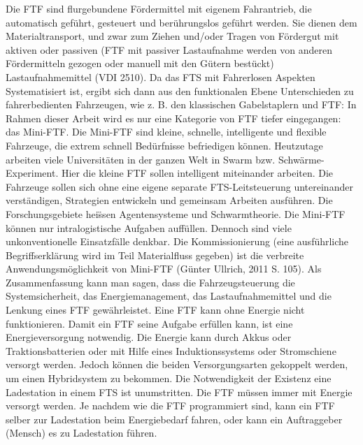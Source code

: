 Die FTF sind flurgebundene F\"ordermittel mit eigenem Fahrantrieb, die automatisch gef\"uhrt, gesteuert und ber\"uhrungslos gef\"uhrt werden. Sie dienen dem Materialtransport, und zwar zum Ziehen und/oder Tragen von F\"ordergut mit aktiven oder passiven (FTF mit passiver Lastaufnahme werden von anderen F\"ordermitteln gezogen oder manuell mit den G\"utern best\"uckt) Lastaufnahmemittel (VDI 2510). Da das FTS mit Fahrerlosen Aspekten Systematisiert ist, ergibt sich dann aus den funktionalen Ebene Unterschieden zu fahrerbedienten Fahrzeugen, wie z. B. den klassischen Gabelstaplern und FTF: In Rahmen dieser Arbeit wird es nur eine Kategorie von FTF tiefer eingegangen: das Mini-FTF. Die Mini-FTF sind kleine, schnelle, intelligente und flexible Fahrzeuge, die extrem schnell Bed\"urfnisse befriedigen k\"onnen. Heutzutage arbeiten viele Universit\"aten in der ganzen Welt in Swarm bzw. Schw\"arme-Experiment. Hier die kleine FTF sollen intelligent miteinander arbeiten. Die Fahrzeuge sollen sich ohne eine eigene separate FTS-Leitsteuerung untereinander verst\"andigen, Strategien entwickeln und gemeinsam Arbeiten ausf\"uhren. Die Forschungsgebiete hei\"ssen Agentensysteme und Schwarmtheorie. Die Mini-FTF k\"onnen nur intralogistische Aufgaben auff\"ullen. Dennoch sind viele unkonventionelle Einsatzf\"alle denkbar. Die Kommissionierung (eine ausf\"uhrliche Begriffserkl\"arung wird im Teil Materialfluss gegeben) ist die verbreite Anwendungsm\"oglichkeit von Mini-FTF (G\"unter Ullrich, 2011 S. 105).
Als Zusammenfassung kann man sagen, dass die Fahrzeugsteuerung die Systemsicherheit, das Energiemanagement, das Lastaufnahmemittel und die Lenkung eines FTF gew\"ahrleistet. Eine FTF kann ohne Energie nicht funktionieren. Damit ein FTF seine Aufgabe erf\"ullen kann, ist eine Energieversorgung notwendig. Die Energie kann durch Akkus oder Traktionsbatterien oder mit Hilfe eines Induktionssystems oder Stromschiene versorgt werden. Jedoch k\"onnen die beiden Versorgungsarten gekoppelt werden, um einen Hybridsystem zu bekommen. Die Notwendigkeit der Existenz eine Ladestation in einem FTS ist unumstritten. Die FTF m\"ussen immer mit Energie versorgt werden. Je nachdem wie die FTF programmiert sind, kann ein FTF selber zur Ladestation beim Energiebedarf fahren, oder kann ein Auftraggeber (Mensch) es zu Ladestation f\"uhren.
